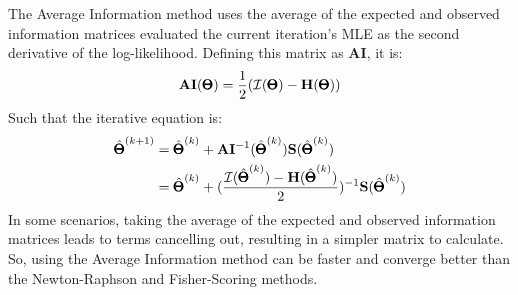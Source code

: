 \documentclass[12pt]{article}
\begin{document}
The Average Information method uses the average of the expected and observed information matrices evaluated the current iteration's MLE as the second derivative of the log-likelihood. Defining this matrix as $\mathbf{AI}$, it is:
$$
\mathbf{AI}(\pmb{\Theta}) = \frac{1}{2}
(\mathcal{I}(\pmb{\Theta}) - \mathbf{H}(\pmb{\Theta}))  
$$
Such that the iterative equation is:
\begin{align*}
\hat{\pmb{\Theta}}^{(k+1)} &= 
\hat{\pmb{\Theta}}^{(k)} +
\mathbf{AI}^{-1} (\hat{\pmb{\Theta}}^{(k)})
\mathbf{S}(\hat{\pmb{\Theta}}^{(k)}) \\
&= 
\hat{\pmb{\Theta}}^{(k)} +
(\frac{\mathcal{I}(\hat{\pmb{\Theta}}^{(k)}) -
\mathbf{H}(\hat{\pmb{\Theta}}^{(k)})}{2})^{-1}
\mathbf{S}(\hat{\pmb{\Theta}}^{(k)})
\end{align*}
In some scenarios, taking the average of the expected and observed information matrices leads to terms cancelling out, resulting in a simpler matrix to calculate.
So, using the Average Information method can be faster and converge better than the Newton-Raphson and Fisher-Scoring methods.
\end{document}
